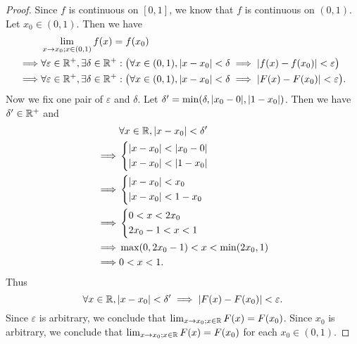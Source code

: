 \begin{proof}
  Since \(f\) is continuous on \([0, 1]\), we know that \(f\) is continuous on \((0, 1)\).
  Let \(x_0 \in (0, 1)\).
  Then we have
  \begin{align*}
             & \lim_{x \to x_0 ; x \in (0, 1)} f(x) = f(x_0)                                                                                                              \\
    \implies & \forall \varepsilon \in \mathbb{R}^+, \exists \delta \in \mathbb{R}^+ : \big(\forall x \in (0, 1), \left\lvert x - x_0\right\rvert < \delta \implies \left\lvert f(x) - f(x_0)\right\rvert < \varepsilon\big)  \\
    \implies & \forall \varepsilon \in \mathbb{R}^+, \exists \delta \in \mathbb{R}^+ : \big(\forall x \in (0, 1), \left\lvert x - x_0\right\rvert < \delta \implies \left\lvert F(x) - F(x_0)\right\rvert < \varepsilon\big).
  \end{align*}
  Now we fix one pair of \(\varepsilon\) and \(\delta\).
  Let \(\delta' = \min(\delta, \abs{x_0 - 0}, \abs{1 - x_0})\).
  Then we have \(\delta' \in \mathbb{R}^+\) and
  \begin{align*}
             & \forall x \in \mathbb{R}, \left\lvert x - x_0\right\rvert < \delta' \\
    \implies & \begin{dcases}
                 \left\lvert x - x_0\right\rvert < \left\lvert x_0 - 0\right\rvert \\
                 \left\lvert x - x_0\right\rvert < \left\lvert1 - x_0\right\rvert
               \end{dcases}             \\
    \implies & \begin{dcases}
                 \left\lvert x - x_0\right\rvert < x_0 \\
                 \left\lvert x - x_0\right\rvert < 1 - x_0
               \end{dcases}                    \\
    \implies & \begin{dcases}
                 0 < x < 2x_0 \\
                 2x_0 - 1 < x < 1
               \end{dcases}                           \\
    \implies & \max(0, 2x_0 - 1) < x < \min(2x_0, 1)     \\
    \implies & 0 < x < 1.
  \end{align*}
  Thus
  \[
    \forall x \in \mathbb{R}, \left\lvert x - x_0\right\rvert < \delta' \implies \left\lvert F(x) - F(x_0)\right\rvert < \varepsilon.
  \]
  Since \(\varepsilon\) is arbitrary, we conclude that \(\lim_{x \to x_0 ; x \in \mathbb{R}} F(x) = F(x_0)\).
  Since \(x_0\) is arbitrary, we conclude that \(\lim_{x \to x_0 ; x \in \mathbb{R}} F(x) = F(x_0)\) for each \(x_0 \in (0, 1)\).


\end{proof}
